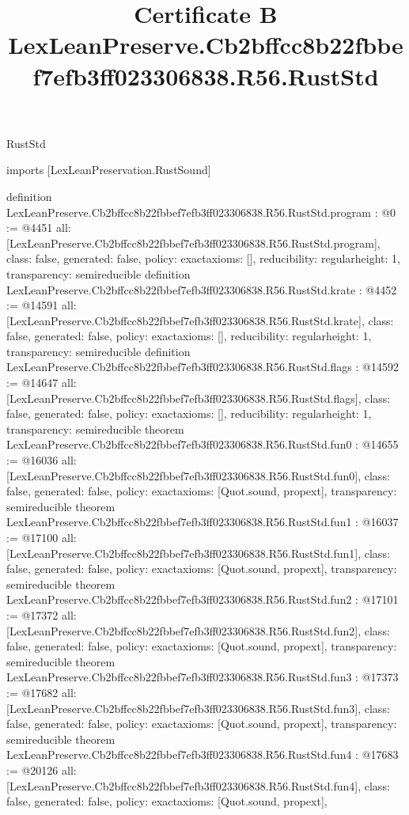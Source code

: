 \begin{lexlean}{RustStd}
\title{Certificate B LexLeanPreserve.Cb2bffcc8b22fbbef7efb3ff023306838.R56.RustStd}
\begin{coremodule}
imports [LexLeanPreservation.RustSound]

definition LexLeanPreserve.Cb2bffcc8b22fbbef7efb3ff023306838.R56.RustStd.program : @0 := @4451 {
  all: [LexLeanPreserve.Cb2bffcc8b22fbbef7efb3ff023306838.R56.RustStd.program],
  class: false,
  generated: false,
  policy: exact{axioms: []},
  reducibility: regular{height: 1},
  transparency: semireducible
}
definition LexLeanPreserve.Cb2bffcc8b22fbbef7efb3ff023306838.R56.RustStd.krate : @4452 := @14591 {
  all: [LexLeanPreserve.Cb2bffcc8b22fbbef7efb3ff023306838.R56.RustStd.krate],
  class: false,
  generated: false,
  policy: exact{axioms: []},
  reducibility: regular{height: 1},
  transparency: semireducible
}
definition LexLeanPreserve.Cb2bffcc8b22fbbef7efb3ff023306838.R56.RustStd.flags : @14592 := @14647 {
  all: [LexLeanPreserve.Cb2bffcc8b22fbbef7efb3ff023306838.R56.RustStd.flags],
  class: false,
  generated: false,
  policy: exact{axioms: []},
  reducibility: regular{height: 1},
  transparency: semireducible
}
theorem LexLeanPreserve.Cb2bffcc8b22fbbef7efb3ff023306838.R56.RustStd.fun0 : @14655 := @16036 {
  all: [LexLeanPreserve.Cb2bffcc8b22fbbef7efb3ff023306838.R56.RustStd.fun0],
  class: false,
  generated: false,
  policy: exact{axioms: [Quot.sound, propext]},
  transparency: semireducible
}
theorem LexLeanPreserve.Cb2bffcc8b22fbbef7efb3ff023306838.R56.RustStd.fun1 : @16037 := @17100 {
  all: [LexLeanPreserve.Cb2bffcc8b22fbbef7efb3ff023306838.R56.RustStd.fun1],
  class: false,
  generated: false,
  policy: exact{axioms: [Quot.sound, propext]},
  transparency: semireducible
}
theorem LexLeanPreserve.Cb2bffcc8b22fbbef7efb3ff023306838.R56.RustStd.fun2 : @17101 := @17372 {
  all: [LexLeanPreserve.Cb2bffcc8b22fbbef7efb3ff023306838.R56.RustStd.fun2],
  class: false,
  generated: false,
  policy: exact{axioms: [Quot.sound, propext]},
  transparency: semireducible
}
theorem LexLeanPreserve.Cb2bffcc8b22fbbef7efb3ff023306838.R56.RustStd.fun3 : @17373 := @17682 {
  all: [LexLeanPreserve.Cb2bffcc8b22fbbef7efb3ff023306838.R56.RustStd.fun3],
  class: false,
  generated: false,
  policy: exact{axioms: [Quot.sound, propext]},
  transparency: semireducible
}
theorem LexLeanPreserve.Cb2bffcc8b22fbbef7efb3ff023306838.R56.RustStd.fun4 : @17683 := @20126 {
  all: [LexLeanPreserve.Cb2bffcc8b22fbbef7efb3ff023306838.R56.RustStd.fun4],
  class: false,
  generated: false,
  policy: exact{axioms: [Quot.sound, propext]},
}
\end{coremodule}
\end{lexlean}
